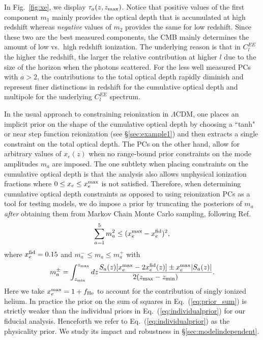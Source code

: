 \documentclass[prd,twocolumn,amsmath,amssymb,floatfix,superscriptaddress,nofootinbib]{revtex4-1}
\newcommand{\wh}[1]{\textcolor{blue}{#1}}
\begin{document}
 In Fig.~\ref{fig:xe}, we display $\tau_a(z,z_{\rm max})$.
 Notice that positive values of the first component $m_1$ mainly provides the optical depth that is accumulated at high redshift whereas {\it negative} values of $m_2$ provides the same for low redshift.    Since these two are the best measured components, the CMB mainly determines the amount of low vs.~high redshift ionization.
The underlying reason is that in $C_l^{EE}$ the higher the redshift, the
larger the relative contribution at higher $l$ due to the size of the horizon when the photons scattered.  For the less well measured PCs with $a>2$, the contributions to the total optical depth rapidly diminish and represent finer distinctions in redshift for the cumulative optical depth and multipole for the underlying $C_l^{EE}$ spectrum.

In the usual approach to constraining reionization in $\Lambda$CDM, one places an implicit prior on the shape of the cumulative optical depth by choosing a ``tanh" or near step function reionization (see \S \ref{sec:example1}) and then extracts a single constraint on the total optical depth.
The PCs on the other hand, allow for arbitrary values of $x_e(z)$ when no range-bound prior constraints on the mode amplitudes $m_a$ are imposed. The one subtlety when placing constraints on the cumulative optical depth is that the analysis also allows
unphysical ionization fractions where $0 \le x_e \le x_e^{\rm max}$  is not satisfied.
Therefore, when determining cumulative optical depth constraints as opposed to using reionization PCs as a tool for testing models,
 we do impose a  prior
 by truncating the posteriors of $m_a$
 {\it after} obtaining them from Markov Chain Monte Carlo sampling, following Ref.~\cite{Mortonson:2008rx}
%
\begin{equation}
\sum_{a=1}^5 m_a^2 \le (x_e^{\rm max}-x_e^{\rm fid})^2,
\label{eq:prior_sum}
\end{equation}
where $x_e^{\rm fid}=0.15$ and $m_a^{-} \le m_a \le m_a^{+}$ with
\begin{equation}
m_a^{\pm} = \int_{z_{\rm min}}^{z_{\rm max} } dz \frac{S_a(z)[x_e^{\rm max} -2 x_e^{\rm fid}(z)]
\pm x_e^{\rm max} | S_a(z)|}{2(z_{\rm max}-z_{\rm min})}.
\label{eq:individualprior}
\end{equation}
Here we take $x_e^{\rm max} = 1+ f_{\rm He} $ to account for the contribution of singly ionized helium.
In practice the prior on the sum of squares in Eq.~(\ref{eq:prior_sum}) is strictly weaker than the individual priors in Eq.~(\ref{eq:individualprior}) for
our fiducial analysis.  Henceforth we refer to Eq.~(\ref{eq:individualprior}) as the physicality prior.  We study its impact and robustness in \S \ref{sec:modelindependent}.
\end{document}
